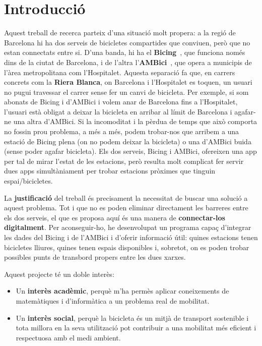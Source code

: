 \chapter{Introducció}
\label{c:introduccio}
Aquest treball de recerca parteix d’una situació molt propera: a la regió de Barcelona hi ha dos serveis de bicicletes compartides que conviuen, però que no estan connectats entre si.
D’una banda, hi ha el \textbf{Bicing}~\cite{bicing-api}, que funciona només dins de la ciutat de Barcelona, i de l’altra l’\textbf{AMBici}~\cite{ambici-api}, que opera a municipis de l’àrea metropolitana com l’Hospitalet.
Aquesta separació fa que, en carrers concrets com la \textbf{Riera Blanca}, on Barcelona i l’Hospitalet es toquen, un usuari no pugui travessar el carrer sense fer un canvi de bicicleta.
Per exemple, si som abonats de Bicing i d’AMBici i volem anar de Barcelona fins a l’Hospitalet, l'usuari està obligat a deixar la bicicleta en arribar al límit de Barcelona i agafar-ne una altra d’AMBici. Si la incomoditat i la pèrdua de temps que això comporta no fossin prou problema, a més a més, podem trobar-nos que arribem a una estació de Bicing plena (on no podem deixar la bicicleta) o una d'AMBici buida (sense poder agafar bicicleta). Els dos serveis, Bicing i AMBici, ofereixen una app per tal de mirar l'estat de les estacions, però resulta molt complicat fer servir dues apps simultàniament per trobar estacions pròximes que tinguin espai/bicicletes.


La \textbf{justificació} del treball és precisament la necessitat de buscar una solució a aquest problema.
Tot i que no es poden eliminar directament les barreres entre els dos serveis, el que es proposa aquí és una manera de \textbf{connectar-los digitalment}.
Per aconseguir-ho, he desenvolupat un programa capaç d’integrar les dades del Bicing i de l’AMBici i d’oferir informació útil: quines estacions tenen bicicletes lliures, quines tenen espais disponibles i, sobretot, on es poden trobar possibles punts de transbord propers entre les dues xarxes.

Aquest projecte té un doble interès:
\begin{itemize}
    \item Un \textbf{interès acadèmic}, perquè m’ha permès aplicar coneixements de matemàtiques i d'informàtica a un problema real de mobilitat.
    \item Un \textbf{interès social}, perquè la bicicleta és un mitjà de transport sostenible i tota millora en la seva utilització pot contribuir a una mobilitat més eficient i respectuosa amb el medi ambient.
\end{itemize}

